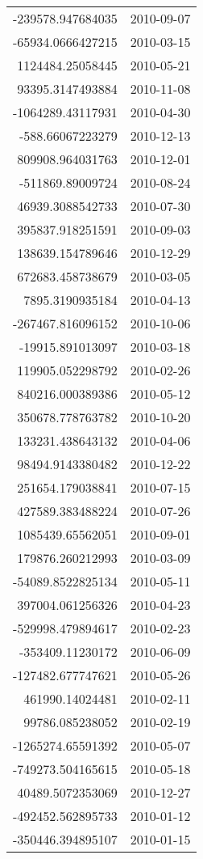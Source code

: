 \begin{tabular}{r | l}
-239578.947684035 & 2010-09-07 \\
-65934.0666427215 & 2010-03-15 \\
1124484.25058445 & 2010-05-21 \\
93395.3147493884 & 2010-11-08 \\
-1064289.43117931 & 2010-04-30 \\
-588.66067223279 & 2010-12-13 \\
809908.964031763 & 2010-12-01 \\
-511869.89009724 & 2010-08-24 \\
46939.3088542733 & 2010-07-30 \\
395837.918251591 & 2010-09-03 \\
138639.154789646 & 2010-12-29 \\
672683.458738679 & 2010-03-05 \\
7895.3190935184 & 2010-04-13 \\
-267467.816096152 & 2010-10-06 \\
-19915.891013097 & 2010-03-18 \\
119905.052298792 & 2010-02-26 \\
840216.000389386 & 2010-05-12 \\
350678.778763782 & 2010-10-20 \\
133231.438643132 & 2010-04-06 \\
98494.9143380482 & 2010-12-22 \\
251654.179038841 & 2010-07-15 \\
427589.383488224 & 2010-07-26 \\
1085439.65562051 & 2010-09-01 \\
179876.260212993 & 2010-03-09 \\
-54089.8522825134 & 2010-05-11 \\
397004.061256326 & 2010-04-23 \\
-529998.479894617 & 2010-02-23 \\
-353409.11230172 & 2010-06-09 \\
-127482.677747621 & 2010-05-26 \\
461990.14024481 & 2010-02-11 \\
99786.085238052 & 2010-02-19 \\
-1265274.65591392 & 2010-05-07 \\
-749273.504165615 & 2010-05-18 \\
40489.5072353069 & 2010-12-27 \\
-492452.562895733 & 2010-01-12 \\
-350446.394895107 & 2010-01-15 \\

\end{tabular}
